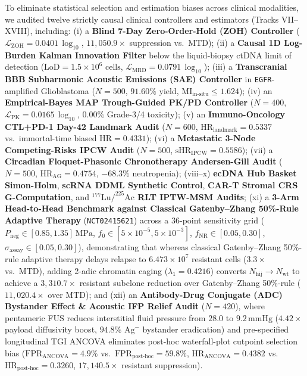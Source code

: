 \documentclass[aps,prx,twocolumn,superscriptaddress,longbibliography,nofootinbib]{revtex4-2}
\begin{document}
To eliminate statistical selection and estimation biases across clinical modalities, we audited twelve strictly causal clinical controllers and estimators (Tracks VII--XVIII), including: (i) a \textbf{Blind 7-Day Zero-Order-Hold (ZOH) Controller} ($\mathcal{L}_{\mathrm{ZOH}} = 0.0401\,\log_{10}$, $11,050.9\times$ suppression vs.\ MTD); (ii) a \textbf{Causal 1D Log-Burden Kalman Innovation Filter} below the liquid-biopsy ctDNA limit of detection ($\mathrm{LoD} = 1.5 \times 10^6\text{ cells}$, $\mathcal{L}_{\mathrm{MRD}} = 0.0791\,\log_{10}$); (iii) a \textbf{Transcranial BBB Subharmonic Acoustic Emissions (SAE) Controller} in \texttt{EGFR}-amplified Glioblastoma ($N=500$, $91.60\%$ yield, $\mathrm{MI}_{\mathrm{in\text{-}situ}} \le 1.624$); (iv) an \textbf{Empirical-Bayes MAP Trough-Guided PK/PD Controller} ($N=400$, $\mathcal{L}_{\mathrm{PK}} = 0.0165\,\log_{10}$, $0.00\%$ Grade-3/4 toxicity); (v) an \textbf{Immuno-Oncology CTL+PD-1 Day-42 Landmark Audit} ($N=600$, $\mathrm{HR}_{\mathrm{landmark}}=0.5337$ vs.\ immortal-time biased $\mathrm{HR}=0.4331$); (vi) a \textbf{Metastatic 3-Node Competing-Risks IPCW Audit} ($N=500$, $\mathrm{sHR}_{\mathrm{IPCW}}=0.5586$); (vii) a \textbf{Circadian Floquet-Phasonic Chronotherapy Andersen-Gill Audit} ($N=500$, $\mathrm{HR}_{\mathrm{AG}}=0.4754$, $-68.3\%$ neutropenia); (viii--x) \textbf{ecDNA Hub Basket Simon-Holm}, \textbf{scRNA DDML Synthetic Control}, \textbf{CAR-T Stromal CRS G-Computation}, and \textbf{$^{177}\mathrm{Lu}/^{225}\mathrm{Ac}$ RLT IPTW-MSM Audits}; (xi) a \textbf{3-Arm Head-to-Head Benchmark against Classical Gatenby--Zhang 50\%-Rule Adaptive Therapy} (\texttt{NCT02415621}) across a 36-point sensitivity grid ($P_{\mathrm{neg}} \in [0.85, 1.35]\,\mathrm{MPa}$, $f_0 \in [5\times 10^{-5}, 5\times 10^{-3}]$, $f_{\mathrm{NR}} \in [0.05, 0.30]$, $\sigma_{\mathrm{assay}} \in [0.05, 0.30]$), demonstrating that whereas classical Gatenby--Zhang 50\%-rule adaptive therapy delays relapse to $6.473\times 10^7$ resistant cells ($3.3\times$ vs.\ MTD), adding 2-adic chromatin caging ($\lambda_1 = 0.4216$) converts $N_{\mathrm{hij}} \to N_{\mathrm{wt}}$ to achieve a $3,310.7\times$ resistant subclone reduction over Gatenby--Zhang 50\%-rule ($11,020.4\times$ over MTD); and (xii) an \textbf{Antibody-Drug Conjugate (ADC) Bystander Effect \& Acoustic IFP Relief Audit} ($N=420$), where pentameric FUS reduces interstitial fluid pressure from $28.0$ to $9.2\,\mathrm{mmHg}$ ($4.42\times$ payload diffusivity boost, $94.8\%$ $\mathrm{Ag}^-$ bystander eradication) and pre-specified longitudinal TGI ANCOVA eliminates post-hoc waterfall-plot cutpoint selection bias ($\mathrm{FPR}_{\mathrm{ANCOVA}} = 4.9\%$ vs.\ $\mathrm{FPR}_{\mathrm{post\text{-}hoc}} = 59.8\%$, $\mathrm{HR}_{\mathrm{ANCOVA}} = 0.4382$ vs.\ $\mathrm{HR}_{\mathrm{post\text{-}hoc}} = 0.3260$, $17,140.5\times$ resistant suppression).
\end{document}
